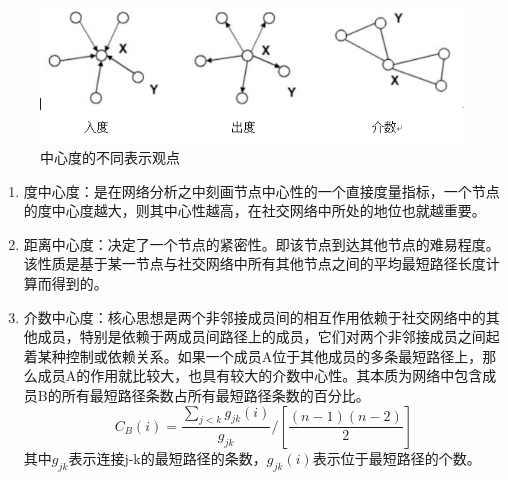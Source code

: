 \begin{figure}[h]
	\centering
	\includegraphics[scale=0.5]{figures/2.png}
	\caption{中心度的不同表示观点}
	\label{fig:1}
\end{figure}
\begin{enumerate}[(1)]
	\item 度中心度：是在网络分析之中刻画节点中心性的一个直接度量指标，一个节点的度中心度越大，则其中心性越高，在社交网络中所处的地位也就越重要。
	\item 距离中心度：决定了一个节点的紧密性。即该节点到达其他节点的难易程度。该性质是基于某一节点与社交网络中所有其他节点之间的平均最短路径长度计算而得到的。
	\item 介数中心度：核心思想是两个非邻接成员间的相互作用依赖于社交网络中的其他成员，特别是依赖于两成员间路径上的成员，它们对两个非邻接成员之间起着某种控制或依赖关系。如果一个成员A位于其他成员的多条最短路径上，那么成员A的作用就比较大，也具有较大的介数中心性。其本质为网络中包含成员B的所有最短路径条数占所有最短路径条数的百分比。
	\begin{equation}
	C_B(i)=\frac{\sum_{j<k}g_{jk}(i)}{g_{jk}}/[\frac{(n-1)(n-2)}{2}]
	\end{equation}
	其中$g_{jk}$表示连接j-k的最短路径的条数，$g_{jk}(i)$表示位于最短路径的个数。
\end{enumerate}






